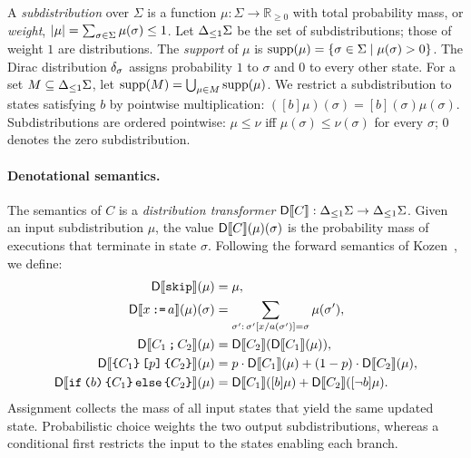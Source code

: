 A \emph{subdistribution} over $\Sigma$ is a function
$\mu:\Sigma\to\mathbb R_{\geq0}$ with total probability mass, or
\emph{weight}, $|\mu|=\sum_{\sigma\in\Sigma}\mu(\sigma)\leq1$.
Let ${\Delta_{\leq 1} \Sigma}$ be the set of subdistributions; those of weight $1$
are distributions. The \emph{support} of $\mu$ is
$\textnormal{supp}(\mu)=\{\sigma\in\Sigma\mid\mu(\sigma)>0\}$.
The Dirac distribution $\delta_{\sigma}$ assigns probability $1$ to
$\sigma$ and $0$ to every other state. For a set
$M\subseteq{\Delta_{\leq 1}\Sigma}$, let
$\textnormal{supp}(M)=\bigcup_{\mu\in M}\textnormal{supp}(\mu)$.
We restrict a subdistribution to states satisfying $b$ by pointwise
multiplication: $([b]\mu)(\sigma)=[b](\sigma)\mu(\sigma)$.
Subdistributions are ordered pointwise:
$\mu\leq\nu$ iff $\mu(\sigma)\leq\nu(\sigma)$ for every $\sigma$;
$0$ denotes the zero subdistribution.

\paragraph{Denotational semantics.}
The semantics of $C$ is a \emph{distribution transformer}
$\mathsf{D}\llbracket C\rrbracket:{\Delta_{\leq 1} \Sigma}\to{\Delta_{\leq 1}\Sigma}$.
Given an input subdistribution $\mu$, the value
$\mathsf{D}\llbracket C\rrbracket(\mu)(\sigma)$ is the probability mass of executions that
terminate in state $\sigma$. Following the forward semantics of
Kozen~\cite{DBLP:conf/focs/Kozen79,DBLP:conf/stoc/Kozen83}, we define:
\begin{align*}
 \mathsf{D}\llbracket \textnormal{\texttt{skip}}\rrbracket(\mu)&=\mu,\\
 \mathsf{D}\llbracket x\,\textnormal{\texttt{:=}}\, a\rrbracket(\mu)(\sigma)
   &=\sum_{\sigma':\,\sigma'[x/a(\sigma')]=\sigma}\mu(\sigma'),\\
 \mathsf{D}\llbracket C_1\,\textnormal{\texttt{;}}\, C_2\rrbracket(\mu)
   &=\mathsf{D}\llbracket C_2\rrbracket(\mathsf{D}\llbracket C_1\rrbracket(\mu)),\\
 \mathsf{D}\llbracket \textnormal{\texttt{\{}} C_1\textnormal{\texttt{\}}} \, \textnormal{\texttt{[}} p\textnormal{\texttt{]}} \, \textnormal{\texttt{\{}} C_2\textnormal{\texttt{\}}}\rrbracket(\mu)
   &=p \cdot \mathsf{D}\llbracket C_1\rrbracket(\mu)+(1-p)\cdot \mathsf{D}\llbracket C_2\rrbracket(\mu),\\
 \mathsf{D}\llbracket \textnormal{\texttt{if}}\,\textnormal{\texttt{(}} b\textnormal{\texttt{)}}\,\textnormal{\texttt{\{}} C_1\textnormal{\texttt{\}}}\,\textnormal{\texttt{else}}\,\textnormal{\texttt{\{}} C_2\textnormal{\texttt{\}}}\rrbracket(\mu)
   &=\mathsf{D}\llbracket C_1\rrbracket([b]\mu)+\mathsf{D}\llbracket C_2\rrbracket([\neg b]\mu).
\end{align*}
Assignment collects the mass of all input states that yield the same
updated state. Probabilistic choice weights the two output
subdistributions, whereas a conditional first restricts the input
to the states enabling each branch.

